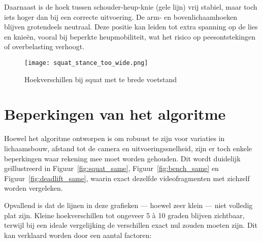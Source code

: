 Daarnaast is de hoek tussen schouder-heup-knie (gele lijn) vrij stabiel, maar toch iets hoger dan bij een correcte uitvoering. De arm- en bovenlichaamhoeken blijven grotendeels neutraal. Deze positie kan leiden tot extra spanning op de lies en knieën, vooral bij beperkte heupmobiliteit, wat het risico op peesontstekingen of overbelasting verhoogt.

\begin{figure}[H]
\centering
\texttt{[image: squat\_stance\_too\_wide.png]}
\caption{Hoekverschillen bij squat met te brede voetstand}
\label{fig:squat_stance_wide}
\end{figure}

\section{Beperkingen van het algoritme}

Hoewel het algoritme ontworpen is om robuust te zijn voor variaties in lichaamsbouw, afstand tot de camera en uitvoeringssnelheid, zijn er toch enkele beperkingen waar rekening mee moet worden gehouden. 
Dit wordt duidelijk geïllustreerd in Figuur~\ref{fig:squat_same}, Figuur~\ref{fig:bench_same} en Figuur~\ref{fig:deadlift_same}, waarin exact dezelfde videofragmenten met zichzelf worden vergeleken.

Opvallend is dat de lijnen in deze grafieken — hoewel zeer klein — niet volledig plat zijn. 
Kleine hoekverschillen tot ongeveer 5 à 10 graden blijven zichtbaar, terwijl bij een ideale vergelijking de verschillen exact nul zouden moeten zijn. 
Dit kan verklaard worden door een aantal factoren:


